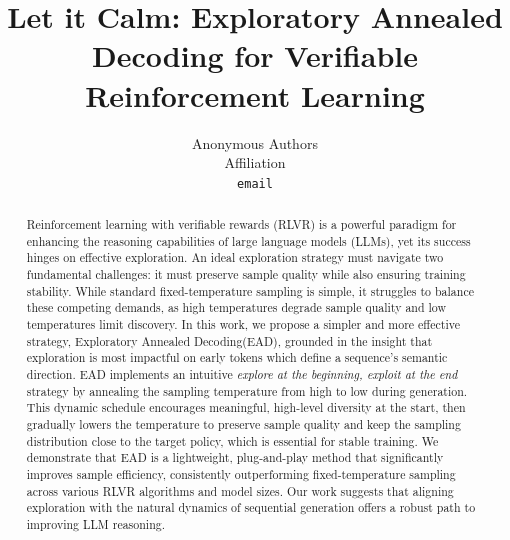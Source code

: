 \documentclass{article} %
\title{Let it Calm: Exploratory Annealed Decoding for Verifiable Reinforcement Learning}
\author{Anonymous Authors \\
Affiliation \\
\texttt{email}
}
\theoremstyle{plain}
\theoremstyle{definition}
\theoremstyle{remark}
\newcommand{\algname}{Exploratory Annealed Decoding\xspace}
\newcommand{\alg}{EAD\xspace}
\begin{document}
\ifcolmsubmission
\linenumbers
\fi

\maketitle

\begin{abstract}
Reinforcement learning with verifiable rewards (RLVR) is a powerful paradigm for enhancing the reasoning capabilities of large language models (LLMs), yet its success hinges on effective exploration. An ideal exploration strategy must navigate two fundamental challenges: it must preserve sample quality while also ensuring training stability. While standard fixed-temperature sampling is simple, it struggles to balance these competing demands, as high temperatures degrade sample quality and low temperatures limit discovery. In this work, we propose a simpler and more effective strategy, \algname (\alg), grounded in the insight that exploration is most impactful on early tokens which define a sequence's semantic direction. \alg implements an intuitive \textit{explore at the beginning, exploit at the end} strategy by annealing the sampling temperature from high to low during generation. 
%
This dynamic schedule encourages meaningful, high-level diversity at the start, then gradually lowers the temperature to preserve sample quality and keep the sampling distribution close to the target policy, which is essential for stable training. 
%
We demonstrate that \alg is a lightweight, plug-and-play method that significantly improves sample efficiency, consistently outperforming fixed-temperature sampling across various RLVR algorithms and model sizes. 
%
Our work suggests that aligning exploration with the natural dynamics of sequential generation offers a robust path to improving LLM reasoning.
\end{abstract}



















\end{document}
